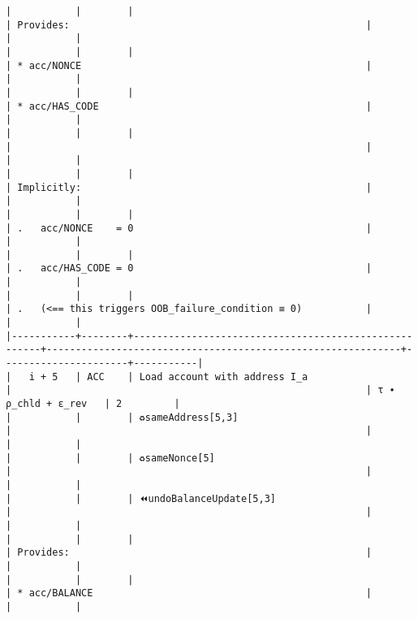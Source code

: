\documentclass[varwidth=\maxdimen,margin=0.5cm,multi={verbatim}]{standalone}
\begin{document}
\begin{verbatim}
|           |        |                                                      | Provides:                                                   |                      |           |
|           |        |                                                      | * acc/NONCE                                                 |                      |           |
|           |        |                                                      | * acc/HAS_CODE                                              |                      |           |
|           |        |                                                      |                                                             |                      |           |
|           |        |                                                      | Implicitly:                                                 |                      |           |
|           |        |                                                      | .   acc/NONCE    = 0                                        |                      |           |
|           |        |                                                      | .   acc/HAS_CODE = 0                                        |                      |           |
|           |        |                                                      | .   (<== this triggers OOB_failure_condition ≡ 0)           |                      |           |
|-----------+--------+------------------------------------------------------+-------------------------------------------------------------+----------------------+-----------|
|   i + 5   | ACC    | Load account with address I_a                        |                                                             | τ ∙ ρ_chld + ε_rev   | 2         |
|           |        | ♻️sameAddress[5,3]                                   |                                                             |                      |           |
|           |        | ♻️sameNonce[5]                                       |                                                             |                      |           |
|           |        | ⏪undoBalanceUpdate[5,3]                             |                                                             |                      |           |
|           |        |                                                      | Provides:                                                   |                      |           |
|           |        |                                                      | * acc/BALANCE                                               |                      |           |

\end{verbatim}
\end{document}
